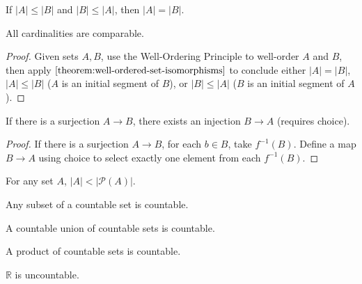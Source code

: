 \documentclass[12pt,letterpaper,reqno]{article}
\begin{document}
\begin{theorem}\label{theorem:schroeder-bernstein}
    If $|A| \le |B|$ and $|B| \le |A|$, then $|A| = |B|$.
\end{theorem}

\begin{proposition}\label{proposition:total-order-of-cardinalities}
    All cardinalities are comparable.
\end{proposition}

\begin{proof}
    Given sets $A, B$, use the Well-Ordering Principle to well-order $A$ and $B$, then apply $\Cref{theorem:well-ordered-set-isomorphisms}$ to conclude either $|A| = |B|$, $|A| \le |B|$ ($A$ is an initial segment of $B$), or $|B| \le |A|$ ($B$ is an initial segment of $A$). 
\end{proof}

\begin{proposition}\label{proposition:from-surjection-get-injection}
    If there is a surjection $A \to B$, there exists an injection $B \to A$ (requires choice).
\end{proposition}

\begin{proof}
    If there is a surjection $A \to B$, for each $b \in B$, take $f^{-1}(B)$. Define a map $B \to A$ using choice to select exactly one element from each $f^{-1}(B)$.
\end{proof}

\begin{theorem}[Cantor]\label{theorem:diagonalization}
    For any set $A$, $|A| < |\mathcal{P}(A)|$.
\end{theorem}

\begin{proposition}\label{proposition:subset-of-countable-countable}
    Any subset of a countable set is countable.
\end{proposition}

\begin{theorem}\label{theorem:countable-union-of-countable-is-countable}
    A countable union of countable sets is countable.
\end{theorem}

\begin{proposition}\label{proposition:product-of-countables-is-countable}
    A product of countable sets is countable.
\end{proposition}

\begin{theorem}\label{theorem:R-uncountable}
    $\mathbb{R}$ is uncountable.
\end{theorem}
\end{document}
